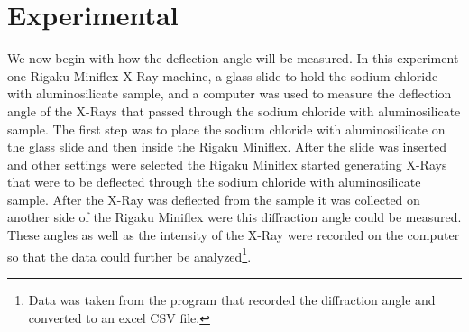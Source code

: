 \documentclass[twocolumn]{article}
\begin{document}
\section*{Experimental}
We now begin with how the deflection angle will be measured. In this experiment one Rigaku Miniflex X-Ray machine, a glass slide to hold the sodium chloride with aluminosilicate sample, and a computer was used to measure the deflection angle of the X-Rays that passed through the sodium chloride with aluminosilicate sample. The first step was to place the sodium chloride with aluminosilicate on the glass slide and then inside the Rigaku Miniflex. After the slide was inserted and other settings were selected the Rigaku Miniflex started generating X-Rays that were to be deflected through the sodium chloride with aluminosilicate sample. After the X-Ray was deflected from the sample it was collected on another side of the Rigaku Miniflex were this diffraction angle could be measured. These angles as well as the intensity of the X-Ray were recorded on the computer so that the data could further be analyzed\footnote{Data was taken from the program that recorded the diffraction angle and converted to an excel CSV file.}. 
\end{document}
